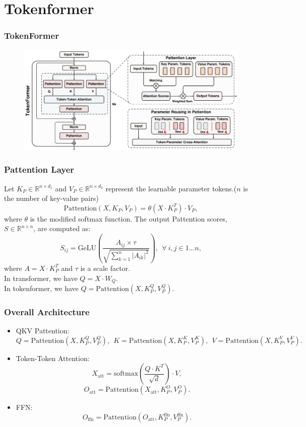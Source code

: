 \section{Tokenformer}
\label{sec:tokenformer}
\begin{frame}
\frametitle{TokenFormer}
\begin{figure}[h]
    \centering
    \includegraphics[width=0.99\linewidth]{./transformer-paper/arch2.pdf}
    \vspace{-0.1cm}
    \label{fig:tokenformer_figure}
    \vspace{-6pt}
\end{figure}
\end{frame}

\begin{frame}
\frametitle{Pattention Layer}
Let $K_P\in \mathbb{R}^{n\times d_1}$ and $V_P\in \mathbb{R}^{n\times d_2}$
represent the learnable parameter tokens.($n$ is the number of key-value pairs)
\begin{equation}
    \text{Pattention}(X,K_P,V_P)=\theta(X\cdot K_P^T)\cdot V_P,
\end{equation}
where $\theta$ is the modified softmax function. The output Pattention
scores, $S\in \mathbb{R}^{n\times n}$, are computed as:
\begin{equation}
    S_{ij} = \text{GeLU}\left(\frac{A_{ij} \times \tau}{\sqrt{\sum_{k=1}^n |A_{ik}|^2}}\right),
    ~~\forall~i,j \in 1...n,
\end{equation}
where $A=X\cdot K_P^T$ and $\tau$ is a scale factor.\\ \vspace{5pt}
In transformer, we have $Q=X\cdot W_Q$.\\
In tokenformer, we have $Q=\text{Pattention}(X,K_P^Q,V_P^Q)$.
\end{frame}

\begin{frame}
\frametitle{Overall Architecture}
\begin{itemize}
    \item QKV Pattention:$$Q=\text{Pattention}(X,K_P^Q,V_P^Q),~~
    K = \text{Pattention}(X,K_P^K,V_P^K),~~ V = \text{Pattention}(X,K_P^V,V_P^V).$$
    \item Token-Token Attention:
    $$X_{\text{att}}=\text{softmax}\left(\frac{Q\cdot K^T}{\sqrt{d}}\right)\cdot V,$$
    $$O_{\text{att}}=\text{Pattention}(X_{\text{att}},K_P^O,V_P^O).$$
    \item FFN:
    $$O_{\text{ffn}}=\text{Pattention}(O_{\text{att}},K_P^{\text{ffn}},V_P^{\text{ffn}}).$$
\end{itemize}
\end{frame}

